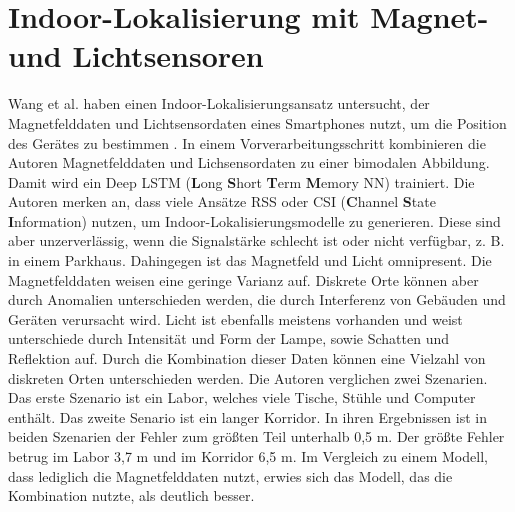 \section{Indoor-Lokalisierung mit Magnet- und Lichtsensoren}
Wang et al. haben einen Indoor-Lokalisierungsansatz untersucht, der Magnetfelddaten und
Lichtsensordaten eines Smartphones nutzt, um die Position des Gerätes zu bestimmen \cite{wang2018deepml}.
In einem Vorverarbeitungsschritt kombinieren die Autoren Magnetfelddaten und Lichsensordaten zu einer bimodalen Abbildung.
Damit wird ein Deep LSTM (\textbf{L}ong  \textbf{S}hort \textbf{T}erm \textbf{M}emory NN) trainiert.
\newline
\newline
Die Autoren merken an, dass viele Ansätze RSS oder CSI (\textbf{C}hannel \textbf{S}tate \textbf{I}nformation) nutzen, um Indoor-Lokalisierungsmodelle zu generieren.
Diese sind aber unzerverlässig, wenn die Signalstärke schlecht ist oder nicht verfügbar, z. B. in einem Parkhaus.
Dahingegen ist das Magnetfeld und Licht omnipresent.
Die Magnetfelddaten weisen eine geringe Varianz auf.
Diskrete Orte können aber durch Anomalien unterschieden werden, die durch Interferenz von Gebäuden und Geräten verursacht wird.
Licht ist ebenfalls meistens vorhanden und weist unterschiede durch Intensität und Form der Lampe, sowie Schatten und Reflektion auf.
Durch die Kombination dieser Daten können eine Vielzahl von diskreten Orten unterschieden werden.
\newline
\newline
Die Autoren verglichen zwei Szenarien.
Das erste Szenario ist ein Labor, welches viele Tische, Stühle und Computer enthält.
Das zweite Senario ist ein langer Korridor.
In ihren Ergebnissen ist in beiden Szenarien der Fehler zum größten Teil unterhalb 0,5 m.
Der größte Fehler betrug im Labor 3,7 m und im Korridor 6,5 m.
Im Vergleich zu einem Modell, dass lediglich die Magnetfelddaten nutzt, erwies sich das Modell, das die Kombination nutzte, als deutlich besser.